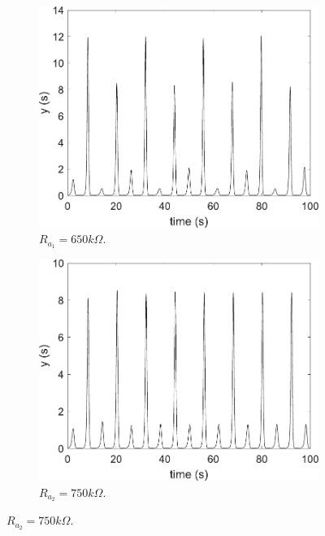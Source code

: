 	    \begin{figure}
        \centering
        \begin{subfigure}[b]{0.22\textwidth}
            \centering
            \includegraphics[scale=0.28]{figs/paraA/outParaA650.pdf}
            \caption{$R_{a_1} = 650k\Omega$.}    
        \end{subfigure}
        \begin{subfigure}[b]{0.22\textwidth}  
            \centering 
            \includegraphics[scale=0.28]{figs/paraA/outParaA750.pdf}
            \caption{$R_{a_2} = 750k\Omega$.}  
        \end{subfigure}

\end{figure}
